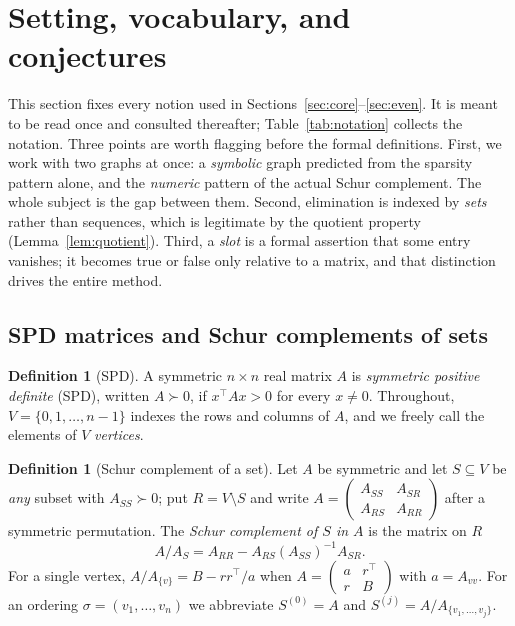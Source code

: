 \documentclass[11pt]{article}
\theoremstyle{plain}
\theoremstyle{definition}
\newtheorem{definition}[theorem]{Definition}
\theoremstyle{remark}
\begin{document}
\section{Setting, vocabulary, and conjectures}\label{sec:setting}
\begin{humanaiblock}
This section fixes every notion used in Sections~\ref{sec:core}--\ref{sec:even}. It is meant to be
read once and consulted thereafter; Table~\ref{tab:notation} collects the notation. Three points are
worth flagging before the formal definitions. First, we work with two graphs at once: a
\emph{symbolic} graph predicted from the sparsity pattern alone, and the \emph{numeric} pattern of
the actual Schur complement. The whole subject is the gap between them. Second, elimination is
indexed by \emph{sets} rather than sequences, which is legitimate by the quotient property
(Lemma~\ref{lem:quotient}). Third, a \emph{slot} is a formal assertion that some entry vanishes; it
becomes true or false only relative to a matrix, and that distinction drives the entire method.

\subsection{SPD matrices and Schur complements of sets}

\begin{definition}[SPD]\label{def:spd}
A symmetric $n\times n$ real matrix $A$ is \emph{symmetric positive definite} (SPD), written
$A\succ0$, if $x^\top Ax>0$ for every $x\neq0$. Throughout, $V=\{0,1,\dots,n-1\}$ indexes the rows
and columns of $A$, and we freely call the elements of $V$ \emph{vertices}.
\end{definition}

\begin{definition}[Schur complement of a set]\label{def:spd-schur}
Let $A$ be symmetric and let $S\subseteq V$ be \emph{any} subset with $A_{SS}\succ0$; put
$R=V\setminus S$ and write $A=\begin{pmatrix}A_{SS}&A_{SR}\\A_{RS}&A_{RR}\end{pmatrix}$ after a
symmetric permutation. The \emph{Schur complement of $S$ in $A$} is the matrix on $R$
\[
A/A_S = A_{RR}-A_{RS}(A_{SS})^{-1}A_{SR}.
\]
For a single vertex, $A/A_{\{v\}}=B-rr^\top/a$ when $A=\begin{pmatrix}a&r^\top\\r&B\end{pmatrix}$ with
$a=A_{vv}$. For an ordering $\sigma=(v_1,\dots,v_n)$ we abbreviate $S^{(0)}=A$ and
$S^{(j)}=A/A_{\{v_1,\dots,v_j\}}$.
\end{definition}


\end{humanaiblock}
\end{document}
